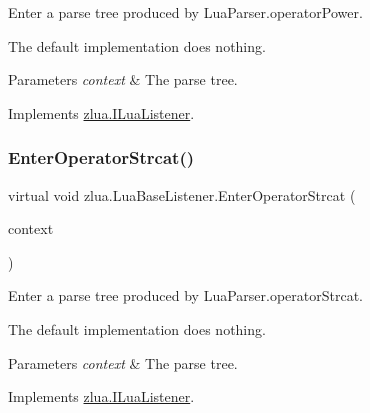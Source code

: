 Enter a parse tree produced by Lua\+Parser.\+operator\+Power. 

The default implementation does nothing.


\begin{DoxyParams}{Parameters}
{\em context} & The parse tree.\\
\hline
\end{DoxyParams}


Implements \mbox{\hyperlink{interfacezlua_1_1_i_lua_listener_ac3dc9682198e2059e103552b21ef1a9c}{zlua.\+I\+Lua\+Listener}}.

\mbox{\label{classzlua_1_1_lua_base_listener_a3bcff2132c345b7cc97fd7782d4f6463}} 
\subsubsection{\texorpdfstring{Enter\+Operator\+Strcat()}{EnterOperatorStrcat()}}
{\footnotesize\ttfamily virtual void zlua.\+Lua\+Base\+Listener.\+Enter\+Operator\+Strcat (\begin{DoxyParamCaption}\item[{\mbox{[}\+Not\+Null\mbox{]} \mbox{\hyperlink{classzlua_1_1_lua_parser_1_1_operator_strcat_context}{Lua\+Parser.\+Operator\+Strcat\+Context}}}]{context }\end{DoxyParamCaption})\hspace{0.3cm}{\ttfamily [virtual]}}



Enter a parse tree produced by Lua\+Parser.\+operator\+Strcat. 

The default implementation does nothing.


\begin{DoxyParams}{Parameters}
{\em context} & The parse tree.\\
\hline
\end{DoxyParams}


Implements \mbox{\hyperlink{interfacezlua_1_1_i_lua_listener_a9fbd70b572afa004220c8cdcaceb641a}{zlua.\+I\+Lua\+Listener}}.

\mbox{\label{classzlua_1_1_lua_base_listener_ac5f8a27439dcc1dbabbc0a23508f7013}} 
